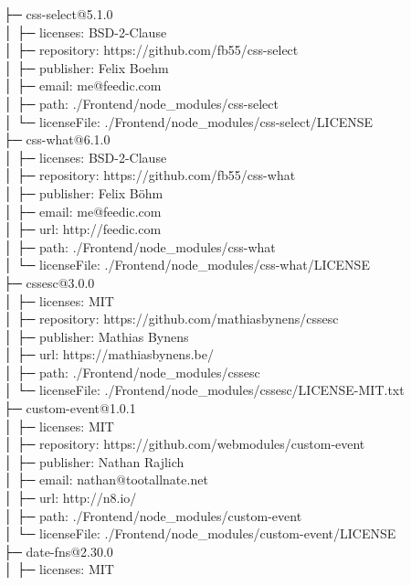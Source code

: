 \documentclass[
    paper=a4,
    twoside=false,
    parskip=half,
    listof=entryprefix,
    listof=totoc,
    index=totoc,
    bibliography=totoc,
    headsepline,
]{scrbook}
\begin{document}
    ├─ css-select@5.1.0\\
    │  ├─ licenses: BSD-2-Clause\\
    │  ├─ repository: https://github.com/fb55/css-select\\
    │  ├─ publisher: Felix Boehm\\
    │  ├─ email: me@feedic.com\\
    │  ├─ path: ./Frontend/node\_modules/css-select\\
    │  └─ licenseFile: ./Frontend/node\_modules/css-select/LICENSE\\
    ├─ css-what@6.1.0\\
    │  ├─ licenses: BSD-2-Clause\\
    │  ├─ repository: https://github.com/fb55/css-what\\
    │  ├─ publisher: Felix Böhm\\
    │  ├─ email: me@feedic.com\\
    │  ├─ url: http://feedic.com\\
    │  ├─ path: ./Frontend/node\_modules/css-what\\
    │  └─ licenseFile: ./Frontend/node\_modules/css-what/LICENSE\\
    ├─ cssesc@3.0.0\\
    │  ├─ licenses: MIT\\
    │  ├─ repository: https://github.com/mathiasbynens/cssesc\\
    │  ├─ publisher: Mathias Bynens\\
    │  ├─ url: https://mathiasbynens.be/\\
    │  ├─ path: ./Frontend/node\_modules/cssesc\\
    │  └─ licenseFile: ./Frontend/node\_modules/cssesc/LICENSE-MIT.txt\\
    ├─ custom-event@1.0.1\\
    │  ├─ licenses: MIT\\
    │  ├─ repository: https://github.com/webmodules/custom-event\\
    │  ├─ publisher: Nathan Rajlich\\
    │  ├─ email: nathan@tootallnate.net\\
    │  ├─ url: http://n8.io/\\
    │  ├─ path: ./Frontend/node\_modules/custom-event\\
    │  └─ licenseFile: ./Frontend/node\_modules/custom-event/LICENSE\\
    ├─ date-fns@2.30.0\\
    │  ├─ licenses: MIT\\
\end{document}
